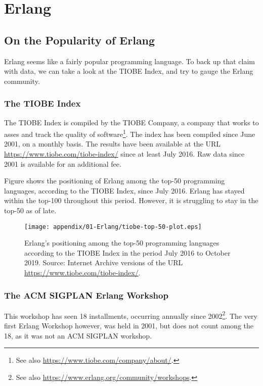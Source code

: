 \chapter{Erlang}
\label{app:erlang}

\section{On the Popularity of Erlang}
\label{app:popularity-of-erlang}

Erlang seems like a fairly popular programming language. To back up
that claim with data, we can take a look at the TIOBE Index, and try
to gauge the Erlang community.

\subsection{The TIOBE Index}

The TIOBE Index is compiled by the TIOBE Company, a company that works
to asses and track the quality of software\footnote{See also
\url{https://www.tiobe.com/company/about/}.}. The index has been
compiled since June 2001, on a monthly basis. The results have been
available at the URL \url{https://www.tiobe.com/tiobe-index/} since at
least July 2016. Raw data since 2001 is available for an additional
fee.

Figure  shows the positioning of
Erlang among the top-50 programming languages, according to the TIOBE
Index, since July 2016. Erlang has stayed within the top-100
throughout this period. However, it is struggling to stay in the
top-50 as of late.

\begin{figure}[h!]
\centering
\texttt{[image: appendix/01-Erlang/tiobe-top-50-plot.eps]}
\caption{Erlang's positioning among the top-50 programming languages
according to the TIOBE Index in the period July 2016 to October 2019.
Source: Internet Archive versions of the URL
\url{https://www.tiobe.com/tiobe-index/}.}
\label{fig:erlang-tiobe-top-50}
\end{figure}

\subsection{The ACM SIGPLAN Erlang Workshop}

This workshop has seen 18 installments, occurring annually since
2002\footnote{See also
\url{https://www.erlang.org/community/workshops}.}. The very first
Erlang Workshop however, was held in 2001, but does not count among
the 18, as it was not an ACM SIGPLAN workshop.

